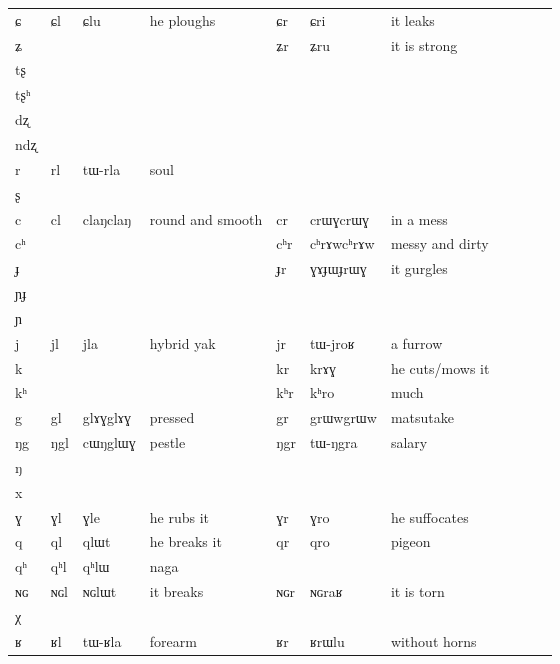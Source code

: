 \documentclass[oldfontcommands,oneside,a4paper,11pt]{article}
\newcommand{\ipa}[1]{{\phon #1}} %
\newcommand{\tib}[1]{\cellcolor{lightgray}\textbf{#1}}
\newcommand{\idph}[1]{\cellcolor{gray}\textbf{#1}}
\begin{document}
\begin{table}
{\begin{tabular}{l|lll|lll|lll|l}
\ipa{ɕ} & 	\ipa{ɕl} & 	\ipa{ɕlu} &he ploughs 	 & 	\ipa{ɕr} & 	\ipa{ɕri} & it leaks	\\
\ipa{ʑ} & 	 & 	  & 	 & 	\ipa{ʑr} & 	\ipa{ʑru} &it is strong 	\\
\ipa{tʂ} & 	 & 	 & 	 & 	 & 	 & 	\\
\ipa{tʂʰ} & 	 & 	 & 	 & 	 & 	 & 	\\
\ipa{dʐ} & 	 & 	 & 	 & 	 & 	 & 	\\
\ipa{ndʐ} & 	 & 	 & 	 & 	 & 	 & 	\\
\ipa{r} & 	\ipa{rl} & 	\ipa{tɯ-rla} &soul 	 & 	 & 	 & 	\\
\ipa{ʂ} & 	 & 	 & 	 & 	 & 	 & 	\\
\ipa{c} & 	\ipa{cl} \idph{}& 	\ipa{claŋclaŋ} & round and smooth	 & 	\ipa{cr} \idph{}& 	\ipa{crɯɣcrɯɣ} & 	in a mess \\
\ipa{cʰ} & 	 & 	 & 	 & 	\ipa{cʰr}\idph{} & 	\ipa{cʰrɤwcʰrɤw} & messy and dirty	\\
\ipa{ɟ} & 	 & 	 & 	 & 	\ipa{ɟr} \idph{}& 	\ipa{ɣɤɟɯɟrɯɣ} & it gurgles	\\
\ipa{ɲɟ} & 	 & 	 & 	 & 	 & 	 & 	\\
\ipa{ɲ} & 	 & 	 & 	 & 	 & 	 & 	\\
\ipa{j} & 	\ipa{jl} & 	\ipa{jla} & 	hybrid yak & 	\ipa{jr} & 	\ipa{tɯ-jroʁ} &a furrow 	\\
\ipa{k} & 	 & 	 & 	 & 	\ipa{kr} & 	\ipa{krɤɣ} & he cuts/mows it	\\
\ipa{kʰ} & 	 & 	 & 	 & 	\ipa{kʰr} & 	\ipa{kʰro} &much 	\\
\ipa{g} & 	\ipa{gl} \idph{}& 	\ipa{glɤɣglɤɣ} & pressed	 & 	\ipa{gr} & 	\ipa{grɯwgrɯw} &matsutake 	\\
\ipa{ŋg} & 	\ipa{ŋgl} & 	\ipa{cɯŋglɯɣ} &pestle 	 & 	\ipa{ŋgr} & 	\ipa{tɯ-ŋgra} &salary 	\\
\ipa{ŋ} & 	 & 	 & 	 & 	 & 	 & 	\\
\ipa{x} & 	 & 	 & 	 & 	 & 	 & 	\\
\ipa{ɣ} & 	\ipa{ɣl} & 	\ipa{ɣle} &he rubs it 	 & 	\ipa{ɣr} & 	\ipa{ɣro} & he suffocates	\\
\ipa{q} & 	\ipa{ql} & 	\ipa{qlɯt} & he breaks it	 & 	\ipa{qr} & 	\ipa{qro} & pigeon	\\
\ipa{qʰ} & 	\ipa{qʰl} \tib{}& 	\ipa{qʰlɯ} &naga 	 & 	 & 	 & 	\\
\ipa{ɴɢ} & 	\ipa{ɴɢl} & 	\ipa{ɴɢlɯt} & 	it breaks & 	\ipa{ɴɢr} & 	\ipa{ɴɢraʁ} &it is torn 	\\
\ipa{χ} & 	 & 	 & 	 & 	 & 	 & 	\\
\ipa{ʁ} & 	\ipa{ʁl} & 	\ipa{tɯ-ʁla} & forearm	 & 	\ipa{ʁr} & 	\ipa{ʁrɯlu} & without horns	\\

\end{tabular}}
\end{table}
\end{document}
